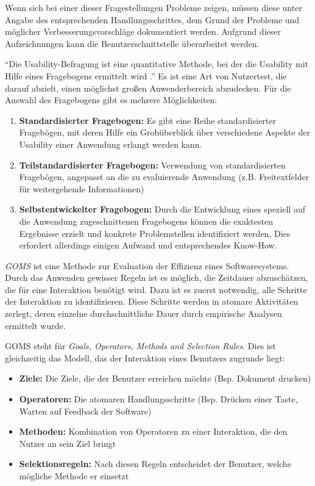 Wenn sich bei einer dieser Fragestellungen Probleme zeigen, müssen diese unter Angabe des entsprechenden Handlungsschrittes, dem Grund der Probleme und möglicher Verbesserungsvorschläge dokumentiert werden. Aufgrund dieser Aufzeichnungen kann die Benutzerschnittstelle überarbeitet werden.\par
{}
\enquote{Die Usability-Befragung ist eine quantitative Methode, bei der die Usability mit Hilfe eines Fragebogens ermittelt wird \cite[S. 236]{Ullenboom2014}.} Es ist eine Art von Nutzertest, die darauf abzielt, einen möglichst großen Anwenderbereich abzudecken. Für die Auswahl des Fragebogens gibt es mehrere Möglichkeiten:
\begin{enumerate}
	\item \textbf{Standardisierter Fragebogen:} Es gibt eine Reihe standardisierter Fragebögen, mit deren Hilfe ein Grobüberblick über verschiedene Aspekte der Usability einer Anwendung erlangt werden kann.
	\item \textbf{Teilstandardisierter Fragebogen:} Verwendung von standardisierten Fragebögen, angepasst an die zu evaluierende Anwendung (z.B. Freitextfelder für weitergehende Informationen)
	\item \textbf{Selbstentwickelter Fragebogen:} Durch die Entwicklung eines speziell auf die Anwendung zugeschnittenen Fragebogens können die exaktesten Ergebnisse erzielt und konkrete Problemstellen identifiziert werden. Dies erfordert allerdings einigen Aufwand und entsprechendes Know-How.
\end{enumerate}
\textit{GOMS} ist eine Methode zur Evaluation der Effizienz eines Softwaresystems. Durch das Anwenden gewisser Regeln ist es möglich, die Zeitdauer abzuschätzen, die für eine Interaktion benötigt wird. Dazu ist es zuerst notwendig, alle Schritte der Interaktion zu identifizieren. Diese Schritte werden in atomare Aktivitäten zerlegt, deren einzelne durchschnittliche Dauer durch empirische Analysen ermittelt wurde.\par
GOMS steht für \textit{Goals, Operators, Methods and Selection Rules}. Dies ist gleichzeitig das Modell, das der Interaktion eines Benutzers zugrunde liegt:
\begin{itemize}
	\item \textbf{Ziele:} Die Ziele, die der Benutzer erreichen möchte (Bsp. Dokument drucken)
	\item \textbf{Operatoren:} Die atomaren Handlungsschritte (Bsp. Drücken einer Taste, Warten auf Feedback der Software)
	\item \textbf{Methoden:} Kombination von Operatoren zu einer Interaktion, die den Nutzer an sein Ziel bringt
	\item \textbf{Selektionsregeln:} Nach diesen Regeln entscheidet der Benutzer, welche mögliche Methode er einsetzt
\end{itemize}
